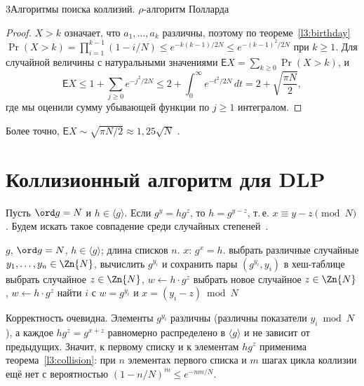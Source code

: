 \begin{lecture}{3}{Алгоритмы поиска коллизий. \texorpdfstring{$\rho$}{ρ}-алгоритм Полларда}
\begin{proof}
$X > k$ означает, что $a_1, \dots, a_k$ различны, поэтому по теореме~\ref{l3:birthday}
$\Pr(X > k) = \prod_{i=1}^{k-1}(1 - i/N) \le e^{-k(k-1)/2N} \le e^{-(k-1)^2/2N}$ при $k \ge 1$.
Для случайной величины с натуральными значениями $\mathsf{E}X = \sum_{k \ge 0} \Pr(X > k)$,
и
\[
  \mathsf{E}X \le 1 + \sum_{j \ge 0} e^{-j^2/2N}
  \le 2 + \int_0^\infty e^{-t^2/2N}\,dt = 2 + \sqrt{\frac{\pi N}{2}},
\]
где мы оценили сумму убывающей функции по $j \ge 1$ интегралом.
\end{proof}

Более точно, $\mathsf{E}X \sim \sqrt{\pi N/2} \approx 1{,}25\sqrt N$ \cite[разд.~14.1]{galbraith}.


\section{Коллизионный алгоритм для DLP}

Пусть $\ord g = N$ и $h \in \langle g \rangle$. Если $g^{y} = h g^{z}$, то
$h = g^{y - z}$, т.\,е. $x \equiv y - z \pmod N$. Будем искать такое совпадение среди
случайных степеней~\cite[разд.~5.4]{hps}.

\begin{algorithm}
\begin{algorithmic}[1]
\Require $g$, $\ord g = N$, $h \in \langle g \rangle$; длина списков $n$.
\Ensure $x$: $g^x = h$.
\State выбрать различные случайные $y_1, \dots, y_n \in \Zn{N}$, вычислить $g^{y_i}$
  и сохранить пары $(g^{y_i}, y_i)$ в хеш-таблице
\State выбрать случайное $z \in \Zn{N}$, $w \gets h \cdot g^{z}$
  \State выбрать новое случайное $z \in \Zn{N}$, $w \gets h \cdot g^{z}$
\EndWhile
\State найти $i$ с $w = g^{y_i}$ и \Return $x = (y_i - z) \bmod N$
\end{algorithmic}
\end{algorithm}

Корректность очевидна. Элементы $g^{y_i}$ различны (различны показатели $y_i \bmod N$), а
каждое $h g^{z} = g^{x + z}$ равномерно распределено в $\langle g \rangle$ и не зависит от
предыдущих. Значит, к первому списку и к элементам $h g^{z}$ применима теорема~\ref{l3:collision}:
при $n$ элементах первого списка и $m$ шагах цикла коллизии ещё нет с вероятностью
$(1 - n/N)^m \le e^{-nm/N}$.


\end{lecture}
